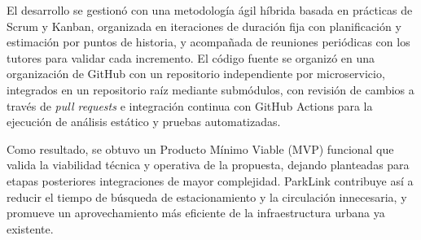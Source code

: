 El desarrollo se gestionó con una metodología ágil híbrida basada en prácticas de Scrum y Kanban, organizada en iteraciones de duración fija con planificación y estimación por puntos de historia, y acompañada de reuniones periódicas con los tutores para validar cada incremento. El código fuente se organizó en una organización de GitHub con un repositorio independiente por microservicio, integrados en un repositorio raíz mediante submódulos, con revisión de cambios a través de \textit{pull requests} e integración continua con GitHub Actions para la ejecución de análisis estático y pruebas automatizadas.

Como resultado, se obtuvo un Producto Mínimo Viable (MVP) funcional que valida la viabilidad técnica y operativa de la propuesta, dejando planteadas para etapas posteriores integraciones de mayor complejidad. ParkLink contribuye así a reducir el tiempo de búsqueda de estacionamiento y la circulación innecesaria, y promueve un aprovechamiento más eficiente de la infraestructura urbana ya existente.
